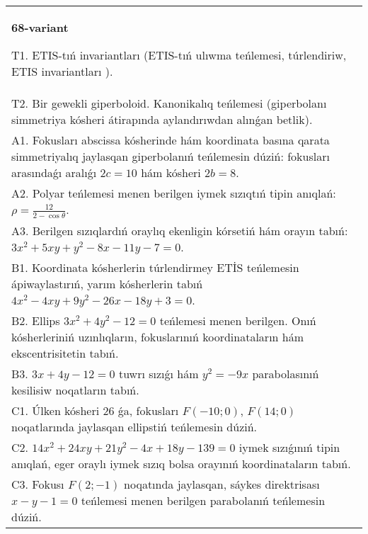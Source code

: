 \documentclass{article}
\begin{document}
\begin{tabular}{m{17cm}}
\textbf{68-variant}
\newline

T1. ETIS-tıń invariantları (ETIS-tıń ulıwma teńlemesi, túrlendiriw, ETIS invariantları ).\\

T2. Bir gewekli giperboloid. Kanonikalıq teńlemesi (giperbolanı simmetriya kósheri átirapında aylandırıwdan alınǵan betlik).\\

A1. Fokusları abscissa kósherinde hám koordinata basına qarata simmetriyalıq jaylasqan giperbolanıń teńlemesin dúziń: fokusları arasındaǵı aralıǵı $2 c=10$ hám kósheri $2 b=8$.\\

A2. Polyar teńlemesi menen berilgen iymek sızıqtıń tipin anıqlań: $\rho=\frac{12}{2-\cos\theta}$.\\

A3. Berilgen sızıqlardıń oraylıq ekenligin kórsetiń hám orayın tabıń: $3 x^{2}+5 xy+y^{2}-8 x-11 y-7=0$.\\

B1. Koordinata kósherlerin túrlendirmey ETİS teńlemesin ápiwaylastırıń, yarım kósherlerin tabıń $4x^{2} - 4xy + 9y^{2} - 26x - 18y + 3 = 0$.\\

B2. Ellips $3x^{2} + 4y^{2} - 12 = 0$ teńlemesi menen berilgen. Onıń kósherleriniń uzınlıqların, fokuslarınıń koordinataların hám ekscentrisitetin tabıń.  \\

B3. $3x + 4y - 12 = 0$ tuwrı sızıǵı hám $y^{2} = - 9x$ parabolasınıń kesilisiw noqatların tabıń.  \\

C1. Úlken kósheri 26 ǵa, fokusları $F( - 10;0)$, $F(14;0)$ noqatlarında jaylasqan ellipstiń teńlemesin dúziń.  \\

C2. $14x^{2} + 24xy + 21y^{2} - 4x + 18y - 139 = 0$ iymek sızıǵınıń tipin anıqlań, eger oraylı iymek sızıq bolsa orayınıń koordinataların tabıń.  \\

C3. Fokusı $F(2; - 1)$ noqatında jaylasqan, sáykes direktrisası $x - y - 1 = 0$ teńlemesi menen berilgen parabolanıń teńlemesin dúziń.  \\

\end{tabular}
\vspace{1cm}
\end{document}

